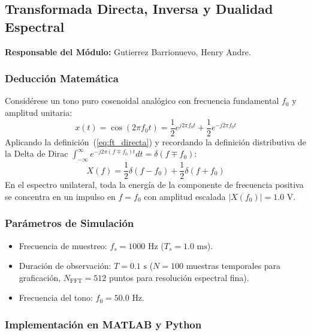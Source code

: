 \documentclass[11pt,a4paper]{article}
\begin{document}
\subsection{Transformada Directa, Inversa y Dualidad Espectral}
\textbf{Responsable del M\'odulo:} Gutierrez Barrionuevo, Henry Andre.

\subsubsection{Deducci\'on Matem\'atica}
Consid\'erese un tono puro cosenoidal anal\'ogico con frecuencia fundamental $f_0$ y amplitud unitaria:
\begin{equation}
  x(t) = \cos(2\pi f_0 t) = \frac{1}{2} e^{j 2\pi f_0 t} + \frac{1}{2} e^{-j 2\pi f_0 t}
\end{equation}
Aplicando la definici\'on~(\ref{eq:ft_directa}) y recordando la definici\'on distributiva de la Delta de Dirac $\int_{-\infty}^{\infty} e^{-j2\pi(f \mp f_0)t} dt = \delta(f \mp f_0)$:
\begin{equation}
  X(f) = \frac{1}{2} \delta(f - f_0) + \frac{1}{2} \delta(f + f_0)
\end{equation}
En el espectro unilateral, toda la energ\'ia de la componente de frecuencia positiva se concentra en un impulso en $f = f_0$ con amplitud escalada $|X(f_0)| = 1.0$ V.

\subsubsection{Par\'ametros de Simulaci\'on}
\begin{itemize}[noitemsep]
  \item Frecuencia de muestreo: $f_s = 1000\text{ Hz}$ ($T_s = 1.0\text{ ms}$).
  \item Duraci\'on de observaci\'on: $T = 0.1\text{ s}$ ($N = 100$ muestras temporales para graficaci\'on, $N_{\text{FFT}} = 512$ puntos para resoluci\'on espectral fina).
  \item Frecuencia del tono: $f_0 = 50.0\text{ Hz}$.
\end{itemize}

\subsubsection{Implementaci\'on en MATLAB y Python}
\end{document}
